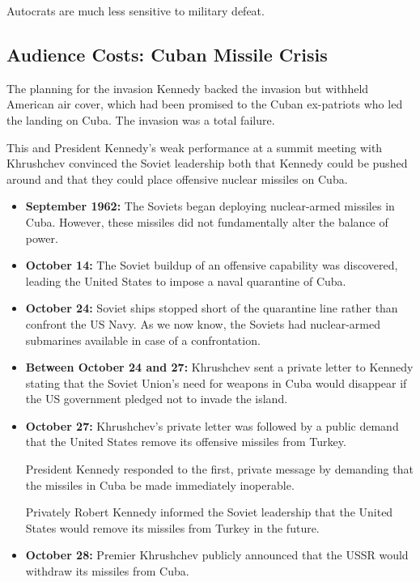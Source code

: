 Autocrats are much less sensitive to military defeat.

\subsection{Audience Costs: Cuban Missile Crisis}
The planning for the invasion Kennedy backed the invasion but withheld American air cover, which had been promised to the Cuban ex-patriots who led the landing on Cuba. The invasion was a total failure.

This and President Kennedy’s weak performance at a summit meeting with Khrushchev convinced the Soviet leadership both that Kennedy could be pushed around and that they could place offensive nuclear missiles on Cuba.

\begin{itemize}
    \item \textbf{September 1962:} The Soviets began deploying nuclear-armed missiles in Cuba. However, these missiles did not fundamentally alter the balance of power.

    \item \textbf{October 14:} The Soviet buildup of an offensive capability was discovered, leading the United States to impose a naval quarantine of Cuba.

    \item \textbf{October 24:} Soviet ships stopped short of the quarantine line rather than confront the US Navy. As we now know, the Soviets had nuclear-armed submarines available in case of a confrontation.

    \item \textbf{Between October 24 and 27:} Khrushchev sent a private letter to Kennedy stating that the Soviet Union's need for weapons in Cuba would disappear if the US government pledged not to invade the island.

    \item \textbf{October 27:} Khrushchev's private letter was followed by a public demand that the United States remove its offensive missiles from Turkey.

    President Kennedy responded to the first, private message by demanding that the missiles in Cuba be made immediately inoperable.

    Privately Robert Kennedy informed the Soviet leadership that the United States would remove its missiles from Turkey in the future.

    \item \textbf{October 28:} Premier Khrushchev publicly announced that the USSR would withdraw its missiles from Cuba.
\end{itemize}

